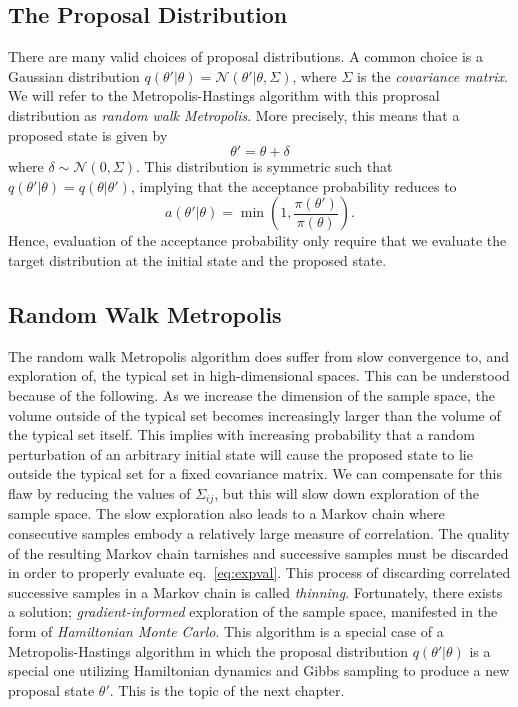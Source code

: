 \subsection{The Proposal Distribution}
There are many valid choices of proposal distributions. A common choice is a Gaussian distribution $q(\theta'|\theta) = \mathcal{N}(\theta'|\theta, \Sigma)$,
where $\Sigma$ is the \textit{covariance matrix}.
We will refer to the Metropolis-Hastings algorithm with this proprosal distribution as \textit{random walk Metropolis}.
More precisely, this means that a proposed state is given by
\begin{equation}
  \theta' = \theta + \delta
\end{equation}
where $\delta \sim \mathcal{N}(0, \Sigma)$. This distribution is symmetric such that $q(\theta'|\theta) = q(\theta|\theta')$, implying that the acceptance probability
reduces to
\begin{equation}\label{eq:symmetric_acceptance_prob}
    a(\theta'|\theta) = \min \left(1, \frac{\pi(\theta')}{\pi(\theta)}\right).
\end{equation}
Hence, evaluation of the acceptance probability only require that we evaluate the target distribution at the initial state and the proposed state.

\subsection{Random Walk Metropolis}
The random walk Metropolis algorithm does suffer from slow convergence to, and exploration of, the typical set in high-dimensional spaces.
This can be understood because of the following. 
As we increase the dimension of the sample space, the volume outside of the typical set becomes increasingly larger than the volume of the typical set itself.
This implies with increasing probability that a random perturbation of an arbitrary initial state will cause the proposed state
to lie outside the typical set for a fixed covariance matrix.
We can compensate
for this flaw by reducing the values of $\Sigma_{ij}$, but this will slow down exploration of the
sample space. The slow exploration also leads to a Markov chain where consecutive
samples embody
a relatively large measure of correlation. 
The quality of the resulting Markov chain tarnishes and successive samples must be discarded in order to properly evaluate eq.~\eqref{eq:expval}.
This process of discarding correlated successive samples in a Markov chain is called \textit{thinning}.
Fortunately, there exists a solution; \textit{gradient-informed} exploration of the sample space, manifested in
the form of \textit{Hamiltonian Monte Carlo}. This algorithm is a special case of a Metropolis-Hastings algorithm
in which the proposal distribution $q(\theta'|\theta)$ is a special one utilizing Hamiltonian dynamics and Gibbs sampling
to produce a new proposal state $\theta'$. This is the topic of the next chapter.

